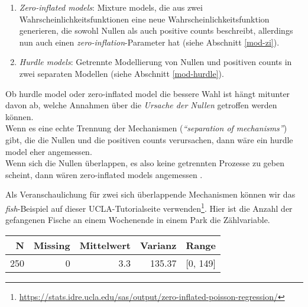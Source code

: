 \documentclass[ngerman,a4paper,]{scrartcl}
\newenvironment{Shaded}{\begin{snugshade}}{\end{snugshade}}
\newcommand{\CommentTok}[1]{\textcolor[rgb]{0.56,0.35,0.01}{\textit{#1}}}
\newcommand{\KeywordTok}[1]{\textcolor[rgb]{0.13,0.29,0.53}{\textbf{#1}}}
\newcommand{\NormalTok}[1]{#1}
\newcommand{\OperatorTok}[1]{\textcolor[rgb]{0.81,0.36,0.00}{\textbf{#1}}}
\renewcommand{\href}[2]{#2\footnote{\url{#1}}}
\providecommand{\tightlist}{%
  \setlength{\itemsep}{0pt}\setlength{\parskip}{0pt}}
\let\rmarkdownfootnote\footnote%
\def\footnote{\protect\rmarkdownfootnote}
\theoremstyle{definition}
\theoremstyle{definition}
\theoremstyle{definition}
\theoremstyle{remark}
\begin{document}
\begin{enumerate}
\def\labelenumi{\arabic{enumi}.}
\tightlist
\item
  \emph{Zero-inflated models}: Mixture models, die aus zwei Wahrscheinlichkeitsfunktionen eine neue Wahrscheinlichkeitsfunktion generieren, die sowohl Nullen als auch positive counts beschreibt, allerdings nun auch einen \emph{zero-inflation}-Parameter hat (siehe Abschnitt \ref{mod-zi}).
\item
  \emph{Hurdle models}: Getrennte Modellierung von Nullen und positiven counts in zwei separaten Modellen (siehe Abschnitt \ref{mod-hurdle}).
\end{enumerate}

Ob hurdle model oder zero-inflated model die bessere Wahl ist hängt mitunter davon ab, welche Annahmen über die \emph{Ursache der Nullen} getroffen werden können.\\
Wenn es eine echte Trennung der Mechanismen (\emph{\enquote{separation of mechanisms}}) gibt, die die Nullen und die positiven counts verursachen, dann wäre ein hurdle model eher angemessen.\\
Wenn sich die Nullen überlappen, es also keine getrennten Prozesse zu geben scheint, dann wären zero-inflated models angemessen \citep[p.~209]{hilbeModelingCountData2014}.

Als Veranschaulichung für zwei sich überlappende Mechanismen können wir das \emph{fish}-Beispiel auf \href{https://stats.idre.ucla.edu/sas/output/zero-inflated-poisson-regression/}{dieser UCLA-Tutorialseite verwenden}. Hier ist die Anzahl der gefangenen Fische an einem Wochenende in einem Park die Zählvariable.

\begin{Shaded}
\end{Shaded}

\begin{table}[H]
\centering
\begin{tabular}{rrrrl}
\toprule
N & Missing & Mittelwert & Varianz & Range\\
\midrule
250 & 0 & 3.3 & 135.37 & [0, 149]\\
\bottomrule
\end{tabular}
\end{table}
\end{document}
